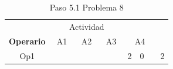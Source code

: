 \documentclass[12pt]{article}  %
\begin{document}
\begin{table}[H]
\centering
\caption{Paso 5.1 Problema 8}
\label{tab:Paso5.1.4Prob8}
\begin{tabular}{cccccccccccccc}
\multicolumn{14}{c}{Actividad}                                                                                                                                                                                                                                                                                                                                                                                                                                                                                                                                                                                                                                                                                                                                             \\ \cline{2-13}
\multicolumn{1}{c|}{\textbf{Operario}} & \multicolumn{3}{c|}{A1}                                                                                                                                                 & \multicolumn{3}{c|}{A2}                                                                                                                                                 & \multicolumn{3}{c|}{A3}                                                                                                                                                 & \multicolumn{3}{c|}{A4}                                                                                                                                                 & \multicolumn{1}{l}{}      \\ \cline{2-13}
\multicolumn{1}{c|}{Op1}               & \multicolumn{1}{c|}{\cellcolor[HTML]{67FD9A}}  & \multicolumn{1}{c|}{\cellcolor[HTML]{FFCC67}}  & \multicolumn{1}{c|}{\cellcolor[HTML]{FCFF2F}}                         & \multicolumn{1}{c|}{\cellcolor[HTML]{67FD9A}}  & \multicolumn{1}{c|}{\cellcolor[HTML]{FFCC67}}  & \multicolumn{1}{c|}{\cellcolor[HTML]{F8FF00}}                         & \multicolumn{1}{c|}{\cellcolor[HTML]{67FD9A}}  & \multicolumn{1}{c|}{\cellcolor[HTML]{FFCC67}}  & \multicolumn{1}{c|}{\cellcolor[HTML]{F8FF00}}                         & \multicolumn{1}{c|}{\cellcolor[HTML]{00D2CB}2} & \multicolumn{1}{c|}{\cellcolor[HTML]{00D2CB}0} & \multicolumn{1}{c|}{\cellcolor[HTML]{00D2CB}{\color[HTML]{FE0000} 0}} & \cellcolor[HTML]{FFCCC9}2 \\ \cline{2-13}

\end{tabular}
\end{table}
\end{document}
